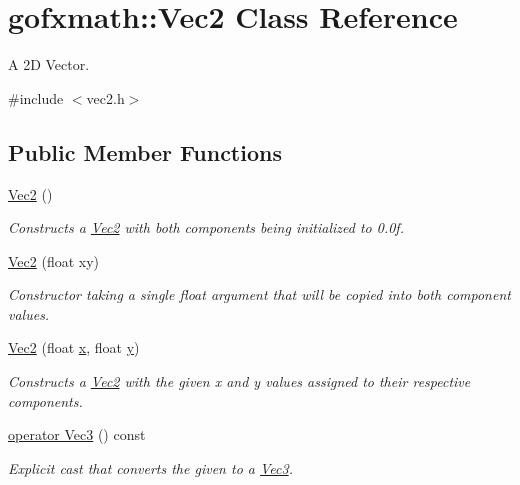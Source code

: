 \hypertarget{classgofxmath_1_1_vec2}{}\section{gofxmath\+:\+:Vec2 Class Reference}
\label{classgofxmath_1_1_vec2}


A 2\+D Vector.  




{\ttfamily \#include $<$vec2.\+h$>$}

\subsection*{Public Member Functions}
\begin{DoxyCompactItemize}
\item 
\hyperlink{classgofxmath_1_1_vec2_a917bbdd7578961e5fab8ca6a754f4d7f}{Vec2} ()
\begin{DoxyCompactList}\small\item\em Constructs a \hyperlink{classgofxmath_1_1_vec2}{Vec2} with both components being initialized to 0.\+0f. \end{DoxyCompactList}\item 
\hyperlink{classgofxmath_1_1_vec2_a025393dfeb09f6fc937e92b62280430f}{Vec2} (float xy)
\begin{DoxyCompactList}\small\item\em Constructor taking a single float argument that will be copied into both component values. \end{DoxyCompactList}\item 
\hyperlink{classgofxmath_1_1_vec2_a10d14900df4ac8ee70be65399677d665}{Vec2} (float \hyperlink{classgofxmath_1_1_vec2_a09ebe2a3b8bdcfe220849bebb45a7e73}{x}, float \hyperlink{classgofxmath_1_1_vec2_ac182a240fd0c4d554b970a1247d796d5}{y})
\begin{DoxyCompactList}\small\item\em Constructs a \hyperlink{classgofxmath_1_1_vec2}{Vec2} with the given x and y values assigned to their respective components. \end{DoxyCompactList}\item 
\hyperlink{classgofxmath_1_1_vec2_a7278bf6d729b6fc7450832d722476ae1}{operator Vec3} () const 
\begin{DoxyCompactList}\small\item\em Explicit cast that converts the given to a \hyperlink{classgofxmath_1_1_vec3}{Vec3}. \end{DoxyCompactList}\item 

\end{DoxyCompactItemize}
